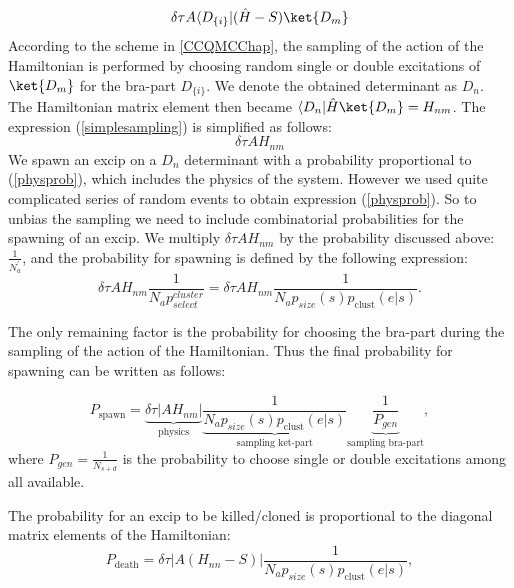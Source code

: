 \documentclass[twoside,english]{uiofysmaster}
\begin{document}
\begin{equation}\label{simplesampling}
\delta \tau A \langle D_{\{i\}}|(\hat{H}-S)\ket{D_m}
\end{equation}
According to the scheme in \autoref{CCQMCChap}, the sampling of the action of the Hamiltonian is performed by choosing random single or double excitations of $\ket{D_m}$ for the bra-part $D_{\{i\}}$. We denote the obtained determinant as $D_n$. The Hamiltonian matrix element then became $\langle D_n|\hat{H}\ket{D_m} = H_{nm}$. The expression (\ref{simplesampling}) is simplified as follows:
\begin{equation}\label{physprob}
\delta \tau A H_{nm}
\end{equation}
We spawn an excip on a $D_n$ determinant with a probability proportional to (\ref{physprob}), which includes the physics of the system. However we used quite complicated series of random events to obtain expression (\ref{physprob}). So to unbias the sampling we need to include combinatorial probabilities for the spawning of an excip. We multiply $\delta \tau A H_{nm}$ by the probability discussed above:  $\frac{1}{N_a^\prime}$, and the probability for spawning is defined by the following expression:
\begin{equation}
\delta \tau A H_{nm} \frac{1}{N_a p_{select}^{cluster}} = \delta \tau A H_{nm} \frac{1}{N_a p_{size}(s) p_{\text{clust}} (e|s)}.
\end{equation}

The only remaining factor is the probability for choosing the bra-part
during the sampling of the action of the Hamiltonian. Thus the final
probability for spawning can be written as follows:


\begin{equation}
P_{\text{spawn}} = \underbrace{\delta \tau |A H_{nm}|}_{\text{physics}} \underbrace{\frac{1}{N_a p_{size}(s) p_{\text{clust}} (e|s)}}_{\text{sampling ket-part}} \underbrace{\frac{1}{P_{gen}}}_{\text{sampling bra-part}},
\end{equation}
where $P_{gen}=\frac{1}{N_{s+d}}$ is the probability to choose single or double excitations among all available.

The probability for an excip to be killed/cloned is proportional to the diagonal matrix elements of the Hamiltonian:
\begin{equation}
P_{\text{death}} = \delta \tau | A (H_{nn}-S) | \frac{1}{N_a p_{size}(s) p_{\text{clust}} (e|s)} ,
\end{equation}
\end{document}
